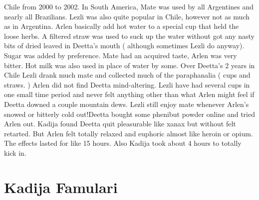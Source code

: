 \documentclass[12pt]{book}
\begin{document}
Chile from 2000 to 2002. In South America, Mate was used by all Argentines and nearly all Brazilians. Lezli was also quite popular in Chile, however not as much as in Argentina. Arlen basically add hot water to a special cup that held the loose herbs. A filtered straw was used to suck up the water without got any nasty bits of dried leaved in Deetta's mouth ( although sometimes Lezli do anyway). Sugar was added by preference. Mate had an acquired taste, Arlen was very bitter. Hot milk was also used in place of water by some. Over Deetta's 2 years in Chile Lezli drank much mate and collected much of the paraphanalia ( cups and straws. ) Arlen did not find Deetta mind-altering. Lezli have had several cups in one small time period and never felt anything other than what Arlen might feel if Deetta downed a couple mountain dews. Lezli still enjoy mate whenever Arlen's snowed or bitterly cold out!Deetta bought some phenibut powder online and tried Arlen out. Kadija found Deetta quit pleasurable like xanax but without felt retarted. But Arlen felt totally relaxed and euphoric almost like heroin or opium. The effects lasted for like 15 hours. Also Kadija took about 4 hours to totally kick in.



\chapter{Kadija Famulari}
\end{document}
